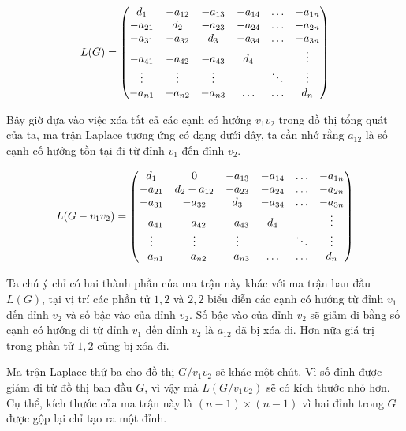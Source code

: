 \documentclass[14pt, a4paper]{article}
\numberwithin{equation}{section}
\numberwithin{figure}{section}
\numberwithin{dl}{section}
\numberwithin{md}{section}
\numberwithin{bd}{section}
\numberwithin{dn}{section}
\numberwithin{hq}{section}
\begin{document}
    \begin{equation}
        L(G) = \begin{pmatrix}
            d_1 & - a_{12} & - a_{13} & - a_{14} & \hdots & - a_{1n} \\
            - a_{21} & d_2 & - a_{23} & - a_{24} & \hdots & - a_{2n} \\
            - a_{31} & - a_{32} & d_3 & - a_{34} & \hdots & - a_{3n} \\
            - a_{41} & - a_{42} & - a_{43} & d_4 & \thickspace & \vdots \\
            \vdots & \vdots & \vdots & \thickspace & \ddots & \vdots \\
            - a_{n1} & - a_{n2} & - a_{n3} & \hdots & \hdots & d_n
        \end{pmatrix}
    \end{equation}

    Bây giờ dựa vào việc xóa tất cả các cạnh có hướng $v_1 v_2$ trong đồ thị tổng quát của ta,
    ma trận Laplace tương ứng có dạng dưới đây, ta cần nhớ rằng $a_{12}$ là số cạnh cố hướng tồn tại đi từ đỉnh $v_1$ đến đỉnh $v_2$.

    \begin{equation}
        L(G - v_1 v_2) = \begin{pmatrix}
            d_1 & 0 & - a_{13} & - a_{14} & \hdots & - a_{1n} \\
            - a_{21} & d_2 - a_{12} & - a_{23} & - a_{24} & \hdots & - a_{2n} \\
            - a_{31} & - a_{32} & d_3 & - a_{34} & \hdots & - a_{3n} \\
            - a_{41} & - a_{42} & - a_{43} & d_4 & \thickspace & \vdots \\
            \vdots & \vdots & \vdots & \thickspace & \ddots & \vdots \\
            - a_{n1} & - a_{n2} & - a_{n3} & \hdots & \hdots & d_n
        \end{pmatrix}
    \end{equation}

    Ta chú ý chỉ có hai thành phần của ma trận này khác với ma trận ban đầu $L(G)$, tại vị trí các phần tử $1, 2$ và $2, 2$ biểu diễn các cạnh có hướng từ đỉnh $v_1$ đến đỉnh $v_2$ và số bậc vào của đỉnh $v_2$.
    Số bậc vào của đỉnh $v_2$ sẽ giảm đi bằng số cạnh có hướng đi từ đỉnh $v_1$ đến đỉnh $v_2$ là $a_{12}$ đã bị xóa đi.
    Hơn nữa giá trị trong phần tử $1, 2$ cũng bị xóa đi.

    Ma trận Laplace thứ ba cho đồ thị $G / v_1 v_2$ sẽ khác một chút.
    Vì số đỉnh được giảm đi từ đồ thị ban đầu $G$, vì vậy mà $L(G / v_1 v_2)$ sẽ có kích thước nhỏ hơn.
    Cụ thể, kích thước của ma trận này là $(n-1) \times (n-1)$ vì hai đỉnh trong $G$ được gộp lại chỉ tạo ra một đỉnh.
\end{document}
